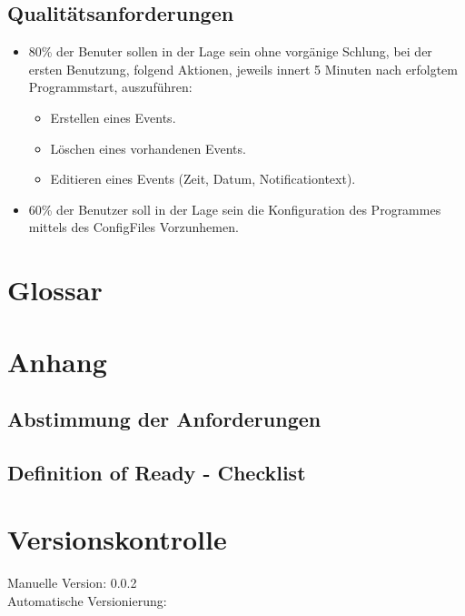 \documentclass[11pt,titelpage]{scrreprt}
\begin{document}
\subsection{Qualitätsanforderungen}
\begin{itemize}
\item 80\% der Benuter sollen in der Lage sein ohne vorgänige Schlung, bei der ersten Benutzung, folgend Aktionen, jeweils innert 5 Minuten nach erfolgtem Programmstart, auszuführen:
\begin{itemize}
\item Erstellen eines Events.
\item Löschen eines vorhandenen Events.
\item Editieren eines Events (Zeit, Datum, Notificationtext).
\end{itemize}

\item 60\% der Benutzer soll in der Lage sein die Konfiguration des Programmes mittels des ConfigFiles Vorzunhemen.
\end{itemize}

\section{Glossar}
\listoffigures
\listoftables

\glsaddall
\printglossary
\section{Anhang}

\subsection{Abstimmung der Anforderungen}
\subsection{Definition of Ready - Checklist}
\section{Versionskontrolle}
Manuelle Version: 0.0.2
\\

\noindent
Automatische Versionierung:
%

\immediate{}

\immediate{}
\end{document}
